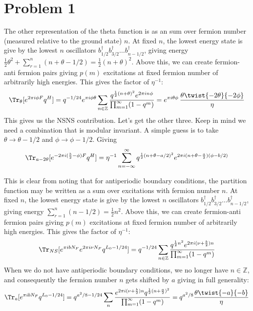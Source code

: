 \section{Problem 1} %
\label{sec:problem_1}

		The other representation of the theta function is as an sum over fermion number (measured relative to the ground state) $n$. At fixed $n$, the lowest energy state is give by the lowest $n$ oscillators $b_{1/2}^\dagger b^\dagger_{3/2} \dots b^\dagger_{n-1/2}$, giving energy $\frac{1}{2} \theta^2 + \sum_{r=1}^n (n+\theta-1/2)  = \frac12 (n+\theta)^2$. Above this, we can create fermion-anti fermion pairs giving $p(m)$ excitations at fixed fermion number of arbitrarily high energies. This gives the factor of $\eta^{-1}$:
		\[
			\Tr_{\theta} [e^{2\pi i \phi F} q^{H}] = q^{-1/24} e^{\pi i \phi \theta} \sum_{n \in \mathbb Z} \frac{q^{\frac12 (n + \theta)^2} e^{2\pi i n \phi}}{\prod_{m=1}^\infty (1-q^m)} = e^{\pi i \theta \phi}\, \frac{\theta \twist{-2\theta}{-2\phi}}{\eta}
		\]
		This gives us the NSNS contribution. Let's get the other three. Keep in mind we need a combination that is modular invariant. A simple guess is to take $\theta \to \theta - 1/2$ and $\phi \to \phi-1/2$.
		Giving
		\[
			\Tr_{a-2\theta} [e^{-2\pi i ( \frac{b}{2} - \phi) F} q^{H}] = \eta^{-1} \sum_{n=-\infty}^\infty q^{\frac12 (n + \theta - a/2)^2} e^{2\pi i (n + \theta - \frac{a}{2}) (\phi - b/2)}
		\]

		This is clear from noting that for antiperiodic boundary conditions, the partition function may be written as a sum over excitations with fermion number $n$. At fixed $n$, the lowest energy state is give by the lowest $n$ oscillators $b_{1/2}^\dagger b^\dagger_{3/2} \dots b^\dagger_{n-1/2}$, giving energy $\sum_{r=1}^n (n-1/2) = \frac12 n^2$. Above this, we can create fermion-anti fermion pairs giving $p(m)$ excitations at fixed fermion number of arbitrarily high energies. This gives the factor of $\eta^{-1}$:
		\[
			\Tr_{NS} [e^{\pi i b N_F} e^{2 \pi i \nu N_F} q^{L_0-1/24}] = q^{-1/24} \sum_{n \in \mathbb Z} \frac{q^{\frac12 n^2} e^{2 \pi i (\nu + \frac{b}{2}) n}}{\prod_{m=1}^\infty (1-q^m)}
		\]
		When we do not have antiperiodic boundary conditions, we no longer have $n \in \mathbb Z$, and consequently the fermion number $n$ gets shifted by $a$ giving in full generality:
		\[
			\Tr_a [e^{\pi i b N_F} q^{L_0-1/24}] = q^{a^2/8 - 1/24} \sum_n \frac{e^{2 \pi i (\nu + \frac{b}{2}) n} q^{\frac12 (n+\frac{a}{2})^2}}{{\prod_{m=1}^\infty (1-q^m)}} = q^{a^2/8} \frac{\theta \twist{-a}{-b}}{\eta}
		\]
		

		
